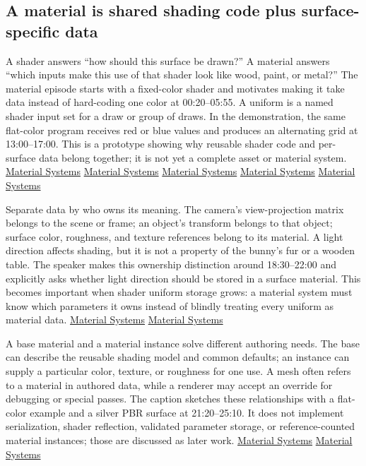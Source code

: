 \subsection{A material is shared shading code plus surface-specific data}\label{06-engine-ii-ch025-a-material-is-shared-shading-code-plus-surface-specific-data}

A shader answers ``how should this surface be drawn?'' A material answers ``which inputs make this use of that shader look like wood, paint, or metal?'' The material episode starts with a fixed-color shader and motivates making it take data instead of hard-coding one color at 00:20--05:55. A uniform is a named shader input set for a draw or group of draws. In the demonstration, the same flat-color program receives red or blue values and produces an alternating grid at 13:00--17:00. This is a prototype showing why reusable shader code and per-surface data belong together; it is not yet a complete asset or material system. \href{https://www.youtube.com/watch?v=2k5FjtMNQsM&t=20s}{Material Systems} \href{https://www.youtube.com/watch?v=2k5FjtMNQsM&t=210s}{Material Systems} \href{https://www.youtube.com/watch?v=2k5FjtMNQsM&t=330s}{Material Systems} \href{https://www.youtube.com/watch?v=2k5FjtMNQsM&t=780s}{Material Systems} \href{https://www.youtube.com/watch?v=2k5FjtMNQsM&t=960s}{Material Systems}

Separate data by who owns its meaning. The camera's view-projection matrix belongs to the scene or frame; an object's transform belongs to that object; surface color, roughness, and texture references belong to its material. A light direction affects shading, but it is not a property of the bunny's fur or a wooden table. The speaker makes this ownership distinction around 18:30--22:00 and explicitly asks whether light direction should be stored in a surface material. This becomes important when shader uniform storage grows: a material system must know which parameters it owns instead of blindly treating every uniform as material data. \href{https://www.youtube.com/watch?v=2k5FjtMNQsM&t=1080s}{Material Systems} \href{https://www.youtube.com/watch?v=2k5FjtMNQsM&t=1230s}{Material Systems}

A base material and a material instance solve different authoring needs. The base can describe the reusable shading model and common defaults; an instance can supply a particular color, texture, or roughness for one use. A mesh often refers to a material in authored data, while a renderer may accept an override for debugging or special passes. The caption sketches these relationships with a flat-color example and a silver PBR surface at 21:20--25:10. It does not implement serialization, shader reflection, validated parameter storage, or reference-counted material instances; those are discussed as later work. \href{https://www.youtube.com/watch?v=2k5FjtMNQsM&t=1280s}{Material Systems} \href{https://www.youtube.com/watch?v=2k5FjtMNQsM&t=1440s}{Material Systems}


